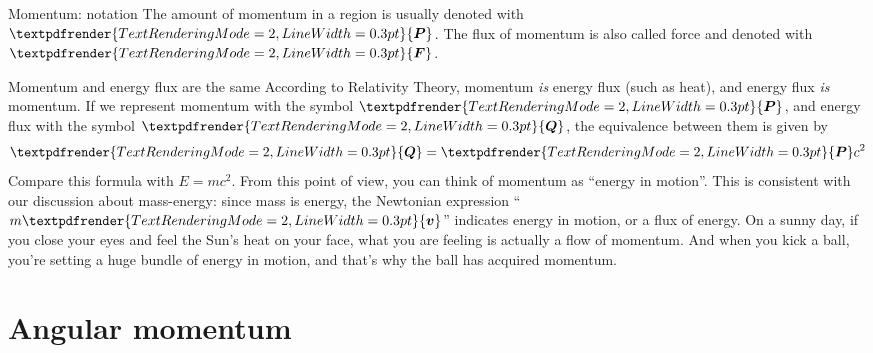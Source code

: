 \documentclass[a4paper,12pt,%
onecolumn,oneside,titlepage,%
british%
]{memoir}
\renewcommand*{\bm}[1]{\textpdfrender{TextRenderingMode=2,LineWidth=0.3pt}{\boldsymbol{#1}}}
\newcommand{\mynotew}[1]{{\footnotesize\color{midgrey}\faIcon{tools}\ #1}}
\renewcommand*{\|}[1][]{\nonscript\:#1\vert\nonscript\:\mathopen{}}
\newcommand*{\sect}{\S}%
\newcommand*{\yP}{\bm{P}}
\newcommand*{\yF}{\bm{F}}
\newcommand*{\masse}{mass-energy}
\begin{document}


\begin{definition}{Momentum: notation}
  The amount of momentum in a region is usually denoted with $\yP$. The flux of momentum is also called force and denoted with $\yF$.
\end{definition}



\begin{extra}{Momentum and energy flux are the same}
  According to Relativity Theory, momentum \emph{is} energy flux (such as heat), and energy flux \emph{is} momentum. If we represent momentum with the symbol $\bm{P}$, and energy flux with the symbol $\bm{Q}$, the equivalence between them is given by
  \begin{equation}
    \label{eq:momentum_heat}
    \bm{Q} = \bm{P}c^{2}
  \end{equation}
  Compare this formula with $E=mc^{2}$. From this point of view, you can think of momentum as \enquote{energy in motion}. This is consistent with our discussion about \masse: since mass is energy, the Newtonian expression \enquote{$m\bm{v}$} indicates energy in motion, or a flux of energy. On a sunny day, if you close your eyes and feel the Sun's heat on your face, what you are feeling is actually a flow of momentum. And when you kick a ball, you're setting a huge bundle of energy in motion, and that's why the ball has acquired momentum.
\end{extra}



\section{Angular momentum}
\label{sec:intro_angmomentum}
\end{document}

